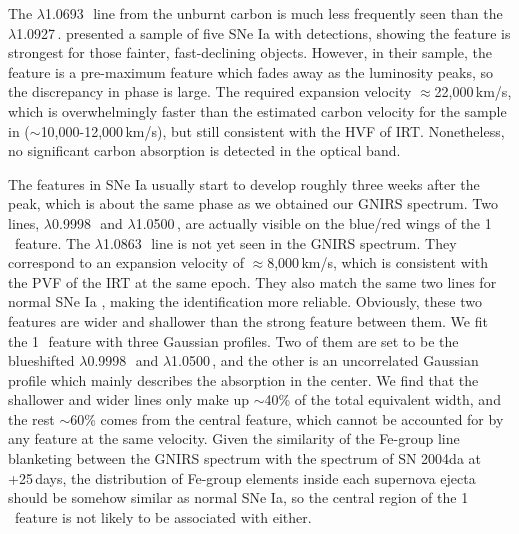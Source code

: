 \documentclass[twocolumn]{aastex631}
\begin{document}
The  $\lambda$1.0693\,\micron\ line from the unburnt carbon is much less frequently seen than the  $\lambda$1.0927\,\micron. \citet{hsiao_CSP_2019} presented a sample of five SNe Ia with  detections, showing the  feature is strongest for those fainter, fast-declining objects. However, in their sample, the  feature is a pre-maximum feature which fades away as the luminosity peaks, so the discrepancy in phase is large. The required expansion velocity $\approx$22,000\,km/s, which is overwhelmingly faster than the estimated carbon velocity for the sample in \citet{hsiao_CSP_2019} ($\sim$10,000-12,000\,km/s), but still consistent with the HVF of  IRT. Nonetheless, no significant carbon absorption is detected in the optical band.

The  features in SNe Ia usually start to develop roughly three weeks after the peak, which is about the same phase as we obtained our GNIRS spectrum. Two  lines, $\lambda$0.9998\,\micron\ and $\lambda$1.0500\,\micron, are actually visible on the blue/red wings of the 1\,\micron\ feature. The  $\lambda$1.0863\,\micron\ line is not yet seen in the GNIRS spectrum. They correspond to an expansion velocity of $\approx$8,000\,km/s, which is consistent with the PVF of the  IRT at the same epoch. They also match the same two lines for normal SNe Ia \citep{Marion2009_NIR}, making the identification more reliable. Obviously, these two  features are wider and shallower than the strong feature between them. We fit the 1\,\micron\ feature with three Gaussian profiles. Two of them are set to be the blueshifted  $\lambda$0.9998\,\micron\ and $\lambda$1.0500\,\micron, and the other is an uncorrelated Gaussian profile which mainly describes the absorption in the center. We find that the shallower and wider  lines only make up $\sim$40\% of the total equivalent width, and the rest $\sim$60\% comes from the central feature, which cannot be accounted for by any  feature at the same velocity. Given the similarity of the Fe-group line blanketing between the GNIRS spectrum with the spectrum of SN 2004da at +25\,days, the distribution of Fe-group elements inside each supernova ejecta should be somehow similar as normal SNe Ia, so the central region of the 1\,\micron\ feature is not likely to be associated with  either.
\end{document}

